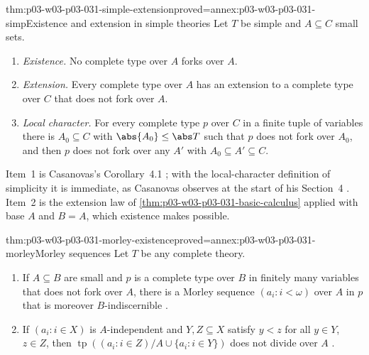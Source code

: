 \begin{hbtheorem}{thm:p03-w03-p03-031-simple-extension}{proved=annex:p03-w03-p03-031-simp}{Existence and extension in simple theories}
Let \(T\) be simple and \(A\subseteq C\) small sets.
\begin{enumerate}
  \item \emph{Existence.}  No complete type over \(A\) forks over \(A\).
  \item \emph{Extension.}  Every complete type over \(A\) has an
        extension to a complete type over \(C\) that does not fork over
        \(A\).
  \item \emph{Local character.}  For every complete type \(p\) over \(C\)
        in a finite tuple of variables there is \(A_0\subseteq C\) with
        \(\abs{A_0}\leq\abs T\) such that \(p\) does not fork over \(A_0\),
        and then \(p\) does not fork over any \(A'\) with
        \(A_0\subseteq A'\subseteq C\).
\end{enumerate}
\end{hbtheorem}

Item~1 is Casanovas's Corollary~4.1 \cite[p.~271]{Casanovas2007Simplicity};
with the local-character definition of simplicity it is immediate, as
Casanovas observes at the start of his Section~4
\cite[p.~268]{Casanovas2007Simplicity}.  Item~2 is the extension law of
\cref{thm:p03-w03-p03-031-basic-calculus} applied with base \(A\) and
\(B=A\), which existence makes possible.

\begin{hblemma}{thm:p03-w03-p03-031-morley-existence}{proved=annex:p03-w03-p03-031-morley}{Morley sequences}
Let \(T\) be any complete theory.
\begin{enumerate}
  \item If \(A\subseteq B\) are small and \(p\) is a complete type over
        \(B\) in finitely many variables that does not fork over \(A\),
        there is a Morley sequence \((a_i:i<\omega)\) over \(A\) in \(p\)
        that is moreover \(B\)-indiscernible
        \cite[Lemma~5.1, p.~272]{Casanovas2007Simplicity}.
  \item If \((a_i:i\in X)\) is \(A\)-independent and \(Y,Z\subseteq X\)
        satisfy \(y<z\) for all \(y\in Y\), \(z\in Z\), then
        \(\operatorname{tp}((a_i:i\in Z)/A\cup\{a_i:i\in Y\})\) does not
        divide over \(A\) \cite[Remark~5.2, p.~272]{Casanovas2007Simplicity}.
\end{enumerate}
\end{hblemma}

